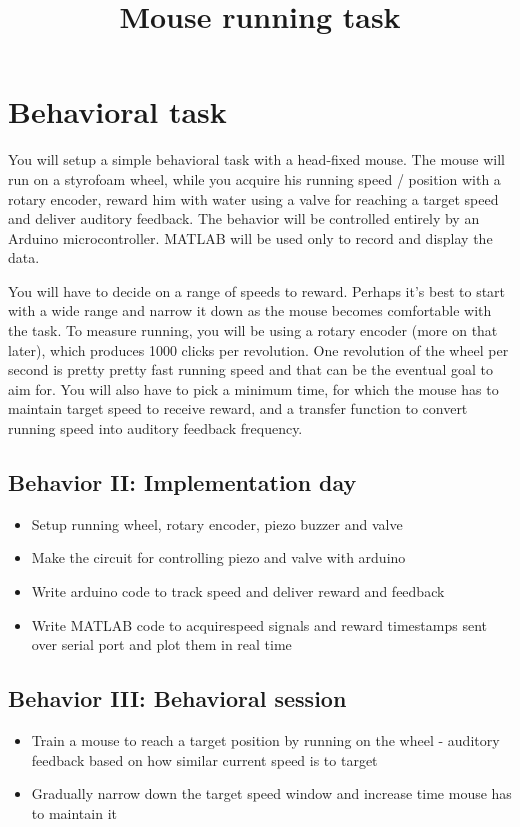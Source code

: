\documentclass[a4paper,10pt]{article}
\title{Mouse running task}
\author{}
\date{}
\begin{document}
\maketitle
\section{Behavioral task}
You will setup a simple behavioral task with a head-fixed mouse. The mouse will run on a styrofoam wheel, 
while you acquire his running speed / position with a rotary encoder, reward him with water using a valve for 
reaching a target speed and deliver auditory feedback. The behavior will be controlled entirely
by an Arduino microcontroller. MATLAB will be used only to record and display the data.

You will have to decide on a range of speeds to reward. Perhaps it's best to start with a wide range
and narrow it down as the mouse becomes comfortable with the task. To measure running, you will be using a rotary encoder
 (more on that later), which produces 1000 clicks per revolution. One revolution of the wheel per second 
 is pretty pretty fast running speed and that can be the eventual goal to aim for. You will also 
 have to pick a minimum time, for which the mouse has to maintain target speed to receive reward, 
and a transfer function to convert running speed into auditory feedback frequency.

\subsection{Behavior II: Implementation day}
\begin{itemize}
 \item Setup running wheel, rotary encoder, piezo buzzer and valve
 \item Make the circuit for controlling piezo and valve with arduino
 \item Write arduino code to track speed and deliver reward and feedback
 \item Write MATLAB code to acquirespeed signals and reward timestamps sent over serial port
 and plot them in real time
\end{itemize}

\subsection{Behavior III: Behavioral session}
\begin{itemize}
 \item Train a mouse to reach a target position by running on the wheel - auditory feedback based on how similar
 current speed is to target
 \item Gradually narrow down the target speed window and increase time mouse has to maintain it
\end{itemize}
\pagebreak
\end{document}

